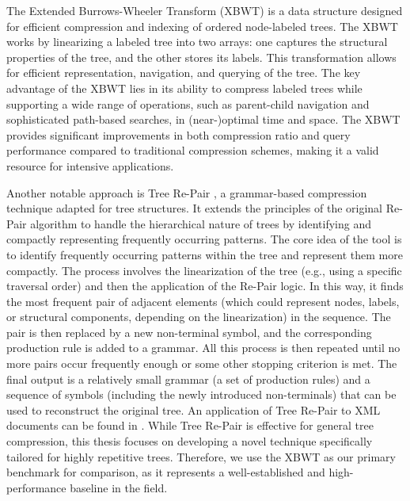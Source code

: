 The Extended Burrows-Wheeler Transform (XBWT) \cite{ferragina2009compressing} is a data structure designed for efficient compression and indexing of ordered node-labeled trees.
The XBWT works by linearizing a labeled tree into two arrays: one captures the structural properties of the tree, and the other stores its labels. This transformation allows for efficient representation, navigation, and querying of the tree. The key advantage of the XBWT lies in its ability to compress labeled trees while supporting a wide range of operations, such as parent-child navigation and sophisticated path-based searches, in (near-)optimal time and space.
The XBWT provides significant improvements in both compression ratio and query performance compared to traditional compression schemes, making it a valid resource for intensive applications.

Another notable approach is Tree Re-Pair \cite{lohrey2011tree}, a grammar-based compression technique adapted for tree structures. It extends the principles of the original Re-Pair algorithm \cite{larsson2000off} to handle the hierarchical nature of trees by identifying and compactly representing frequently occurring patterns.
The core idea of the tool is to identify frequently occurring patterns within the tree and represent them more compactly.
The process involves the linearization of the tree (e.g., using a specific traversal order) and then the application of the Re-Pair logic. In this way, it finds the most frequent pair of adjacent elements (which could represent nodes, labels, or structural components, depending on the linearization) in the sequence. The pair is then replaced by a new non-terminal symbol, and the corresponding production rule is added to a grammar. All this process is then repeated until no more pairs occur frequently enough or some other stopping criterion is met. The final output is a relatively small grammar (a set of production rules) and a sequence of symbols (including the newly introduced non-terminals) that can be used to reconstruct the original tree. An application of Tree Re-Pair to XML documents can be found in \cite{lohrey2013xml}.
While Tree Re-Pair is effective for general tree compression, this thesis focuses on developing a novel technique specifically tailored for highly repetitive trees. Therefore, we use the XBWT as our primary benchmark for comparison, as it represents a well-established and high-performance baseline in the field.

